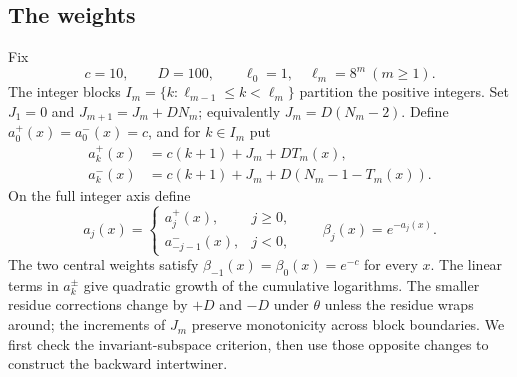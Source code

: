 \subsection{The weights}
Fix
\[
 c=10,\qquad D=100,\qquad \ell_0=1,\quad\ell_m=8^m\ (m\ge1).
\]
The integer blocks $I_m=\{k:\ell_{m-1}\le k<\ell_m\}$ partition the positive integers. Set $J_1=0$ and $J_{m+1}=J_m+DN_m$; equivalently $J_m=D(N_m-2)$. Define $a_0^+(x)=a_0^-(x)=c$, and for $k\in I_m$ put
\begin{align}
 a_k^+(x)&=c(k+1)+J_m+DT_m(x),\label{eq:a-plus}\\
 a_k^-(x)&=c(k+1)+J_m+D(N_m-1-T_m(x)).\label{eq:a-minus}
\end{align}
On the full integer axis define
\begin{equation}\label{eq:bilateral-a}
 a_j(x)=\begin{cases}a_j^+(x),&j\ge0,\\a_{-j-1}^-(x),&j<0,\end{cases}
 \qquad \beta_j(x)=e^{-a_j(x)}.
\end{equation}
The two central weights satisfy $\beta_{-1}(x)=\beta_0(x)=e^{-c}$ for every $x$.
The linear terms in $a_k^\pm$ give quadratic growth of the cumulative logarithms. The smaller residue corrections change by $+D$ and $-D$ under $\theta$ unless the residue wraps around; the increments of $J_m$ preserve monotonicity across block boundaries. We first check the invariant-subspace criterion, then use those opposite changes to construct the backward intertwiner.

